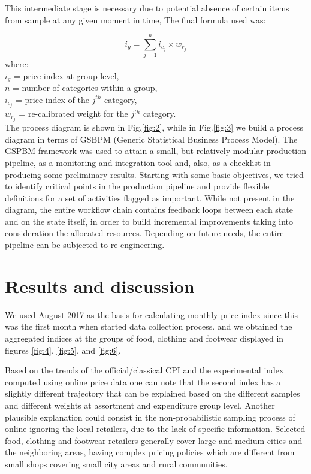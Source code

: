 \documentclass[]{article}
\begin{document}
This intermediate stage is necessary due to potential absence of certain items from sample at any given moment in time, 
The final formula used was:

\begin{equation}\label{eq:8}
	i_{g} = \sum_{j=1}^{n} i_{c_{j}} \times w_{r_{j}}
\end{equation}
where:\\
$i_{g}$ = price index at group level, \\
$n$ = number of categories within a group, \\
$i_{c_{j}}$ = price index of the $j^{th}$ category, \\
$w_{r_{j}}$ = re-calibrated weight for the $j^{th}$ category.\\


The process diagram is shown in Fig.\ref{fig:2}, while in Fig.\ref{fig:3} we build a process diagram in terms of GSBPM (Generic Statistical Business Process Model)\cite{gsbpm}. The GSPBM framework was used to attain a small, but relatively modular production pipeline, as a monitoring and integration tool and, also, as a checklist in producing some preliminary results. Starting with some basic objectives, we tried to identify critical points in the production pipeline and provide flexible definitions for a set of activities flagged as important. While not present in the diagram, the entire workflow chain contains feedback loops between each state and on the state itself, in order to build incremental improvements taking into consideration the allocated resources. Depending on future needs, the entire pipeline can be subjected to re-engineering.      





\section{Results and discussion } \label{results}

We used August 2017 as the basis for calculating monthly price index since this was the first month when started data collection process.
and we obtained the aggregated indices at the 
groups of food, clothing and footwear displayed in figures \ref{fig:4}, \ref{fig:5}, and \ref{fig:6}.


Based on the trends of the official/classical CPI and the experimental index computed using online price data one can note that the second index has a slightly different trajectory that can be explained based on the different samples and different weights at assortment and expenditure group level. 
Another plausible explanation could consist in the non-probabilistic sampling process of online ignoring the local retailers, due to the lack of specific information. Selected food, clothing and footwear retailers generally cover large and medium cities and the neighboring areas, having complex pricing 
policies which are different from small shops covering small city areas and rural communities.
\end{document}
